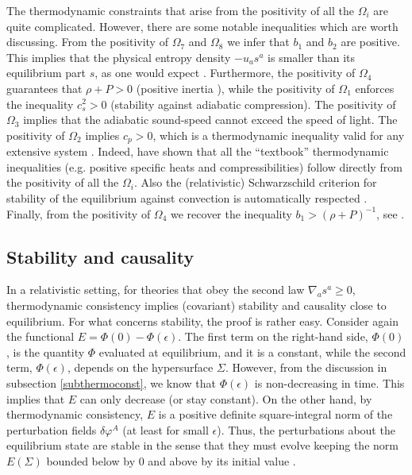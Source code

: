 \documentclass[a4paper, amsfonts, amssymb, amsmath, reprint, showkeys, nofootinbib, twoside, onecolumn, notitlepage]{revtex4-1}
\theoremstyle{definition}
\theoremstyle{theorem}
\begin{document}
The thermodynamic constraints that arise from the positivity of all the $\Omega_i$ are quite complicated. However, there are some notable inequalities which are worth discussing. From the positivity of $\Omega_7$ and $\Omega_8$ we infer that $b_1$ and $b_2$ are positive. This implies that the physical entropy density $-u_a s^a$ is smaller than its equilibrium part $s$, as one would expect \cite{Israel_Stewart_1979}. Furthermore, the positivity of $\Omega_4$ guarantees that $\rho+P>0$ (positive inertia \cite{MTW_book}), while the positivity of $\Omega_1$ enforces the inequality $c_s^2>0$ (stability against adiabatic compression). The positivity of $\Omega_3$ implies that the adiabatic sound-speed cannot exceed the speed of light. The positivity of $\Omega_2$ implies $c_p>0$, which is a thermodynamic inequality valid for any extensive system \cite{landau5}. Indeed, \citet{Hishcock1983} have shown that all the ``textbook'' thermodynamic inequalities (e.g. positive specific heats and compressibilities) follow directly from the positivity of all the $\Omega_i$. Also the (relativistic) Schwarzschild criterion for stability of the equilibrium against convection is automatically respected \cite{Hishcock1983}. Finally, from the positivity of $\Omega_4$ we recover the inequality $b_1 > (\rho+P)^{-1}$, see \cite{GavassinoLyapunov_2020}.

\subsection{Stability and causality}

In a relativistic setting, for theories that obey the second law $\nabla_a s^a \geq 0$, thermodynamic consistency implies (covariant) stability \cite{GavassinoGibbs2021} and causality \cite{GavassinoCausality2021} close to equilibrium. For what concerns stability, the proof is rather easy. Consider again the functional $E=\Phi(0)-\Phi(\epsilon)$. The first term on the right-hand side, $\Phi(0)$, is the quantity $\Phi$ evaluated at equilibrium, and it is a constant, while the second term, $\Phi(\epsilon)$, depends on the hypersurface $\Sigma$. However, from the discussion in subsection \ref{subthermoconst}, we know that $\Phi(\epsilon)$ is non-decreasing in time. This implies that $E$ can only decrease (or stay constant). On the other hand, by thermodynamic consistency, $E$ is a positive definite square-integral norm of the perturbation fields $\delta \varphi^A$ (at least for small $\epsilon$). Thus, the perturbations about the equilibrium state are stable in the sense that they must evolve keeping the norm $E(\Sigma)$ bounded below by 0 and above by its initial value \cite{Hishcock1983}. 
\end{document}
